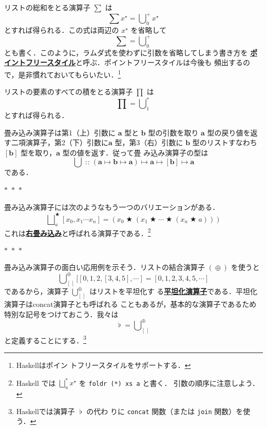 \documentclass[a5paper,twoside,fleqn,draft]{jsbook}
\newcommand{\separator}{\begin{center}$*$~$*$~$*$\end{center}}
\newcommand{\programminglanguage}[1]{\textsf{#1}}
\newcommand{\haskell}{\programminglanguage{Haskell}}
\newcommand{\keyword}[1]{{\underline{\textbf{#1}}}}
\newcommand{\code}[1]{\texttt{#1}}
\newcommand{\mEmptyList}{{[\,]}}
\DeclareMathOperator{\mAppend}{\oplus}
\DeclareMathOperator{\mBinOp}{\bigstar}
\DeclareMathOperator*{\mFold}{\bigcup}
\DeclareMathOperator*{\mFoldRight}{\bigsqcup}
\DeclareMathOperator{\mIn}{{:\!:}}
\DeclareMathOperator{\mJoinList}{\flat} %
\DeclareMathOperator{\mMapsTo}{\mapsto}
\newcommand{\mType}[1]{\mathbf{#1}} %
\newcommand{\mA}{\mType{a}}
\newcommand{\mB}{\mType{b}}
\newcommand{\mList}[1]{{#1}^\mathrm{\star}}
\begin{document}
リストの総和をとる演算子 $\sum$ は
\begin{equation}
  \sum\mList{x}
  =\mFold^+_0\mList{x}
\end{equation}
とすれば得られる．この式は両辺の $\mList{x}$ を省略して
\begin{equation}
  \sum
  =\mFold^+_0
\end{equation}
とも書く．このように，ラムダ式を使わずに引数を省略してしまう書き方を
\keyword{ポイントフリースタイル}と呼ぶ．ポイントフリースタイルは今後も
頻出するので，是非慣れておいてもらいたい．\footnote{\haskell はポイン
  トフリースタイルをサポートする．}

リストの要素のすべての積をとる演算子 $\prod$ は
\begin{equation}
  \prod
  =\mFold^*_1
\end{equation}
とすれば得られる．

畳み込み演算子は第1（上）引数に $\mA$ 型と $\mB$ 型の引数を取り $\mA$
型の戻り値を返す二項演算子，第2（下）引数に$\mA$ 型，第3（右）引数に
$\mB$ 型のリストすなわち$[\mB]$ 型を取り，$\mA$ 型の値を返す．従って畳
み込み演算子の型は
\begin{equation}
  \mFold
  \mIn(\mA\mMapsTo\mB\mMapsTo\mA)
  \mMapsTo\mA
  \mMapsTo[\mB]
  \mMapsTo\mA
\end{equation}
である．

\separator

畳み込み演算子には次のようなもう一つのバリエーションがある．
\begin{equation}
  \mFoldRight^{\mBinOp}_a[x_0,x_1\dotsb x_n]
  =(x_0\mBinOp(x_1\mBinOp\dotsb\mBinOp(x_n\mBinOp a)))
\end{equation}
これは\keyword{右畳み込み}と呼ばれる演算子である．\footnote{\haskell
  では $\mFoldRight^{*}_a\mList{x}$ を \code{foldr (*) xs a} と書く．
  引数の順序に注意しよう．}

\separator

畳み込み演算子の面白い応用例を示そう．リストの結合演算子 $(\mAppend)$
を使うと
\begin{equation}
  \mFold_\mEmptyList^{\mAppend}[[0,1,2,[3,4,5],\dotsb]
  =[0,1,2,3,4,5,\dotsb]
\end{equation}
であるから，演算子 $\mFold_\mEmptyList^{\mAppend}$ はリストを平坦化す
る\keyword{平坦化演算子}である．平坦化演算子はconcat演算子とも呼ばれる
こともあるが，基本的な演算子であるため特別な記号をつけておこう．我々は
\begin{equation}
  \mJoinList
  =\mFold_\mEmptyList^{\mAppend}
\end{equation}
と定義することにする．\footnote{\haskell では演算子 $\mJoinList$ の代わ
  りに \code{concat} 関数（または \code{join} 関数）を使う．}
\end{document}
